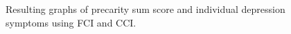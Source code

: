 \documentclass[
]{article}
\begin{document}
\begin{figure}

\begin{minipage}{\linewidth}



\end{minipage}%
\newline
\begin{minipage}{\linewidth}



\end{minipage}%

\caption{\label{fig-presum}Resulting graphs of precarity sum score and
individual depression symptoms using FCI and CCI.}

\end{figure}%
\end{document}
